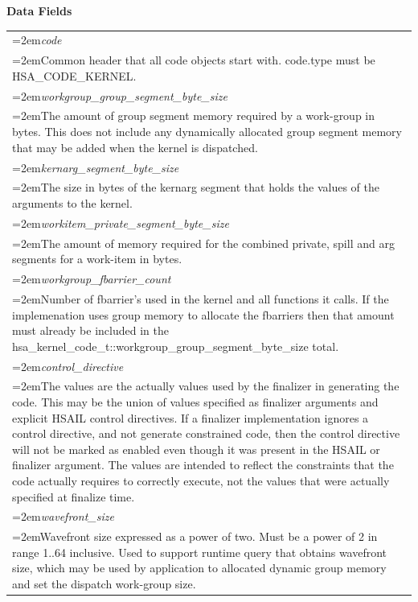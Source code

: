 \documentclass{book}
\newcommand{\hsaarg}[1]{\textit{#1}}
\newcommand{\hsatyp}[2]{\hypertarget{#1}{#2}}
\begin{document}
\begin{appendices}
\noindent\textbf{Data Fields}\\[-5mm]
\begin{longtable}{@{}>{\hangindent=2em}p{\textwidth}}
\hsaarg{code}\\\hspace{2em}Common header that all code objects start with. code.type must be HSA\_CODE\_KERNEL.\\[2mm]
\hsaarg{workgroup\_group\_segment\_byte\_size}\\\hspace{2em}The amount of group segment memory required by a work-group in bytes. This does not include any dynamically allocated group segment memory that may be added when the kernel is dispatched.\\[2mm]
\hsaarg{kernarg\_segment\_byte\_size}\\\hspace{2em}The size in bytes of the kernarg segment that holds the values of the arguments to the kernel.\\[2mm]
\hsaarg{workitem\_private\_segment\_byte\_size}\\\hspace{2em}The amount of memory required for the combined private, spill and arg segments for a work-item in bytes.\\[2mm]
\hsaarg{workgroup\_fbarrier\_count}\\\hspace{2em}Number of fbarrier's used in the kernel and all functions it calls. If the implemenation uses group memory to allocate the fbarriers then that amount must already be included in the \hsatyp{structhsa__kernel__code__s_1a0f9948c20217d0600147d5e566e47a7b}{hsa\_kernel\_code\_t::workgroup\_group\_segment\_byte\_size} total.\\[2mm]
\hsaarg{control\_directive}\\\hspace{2em}The values are the actually values used by the finalizer in generating the code. This may be the union of values specified as finalizer arguments and explicit HSAIL control directives. If a finalizer implementation ignores a control directive, and not generate constrained code, then the control directive will not be marked as enabled even though it was present in the HSAIL or finalizer argument. The values are intended to reflect the constraints that the code actually requires to correctly execute, not the values that were actually specified at finalize time.\\[2mm]
\hsaarg{wavefront\_size}\\\hspace{2em}Wavefront size expressed as a power of two. Must be a power of 2 in range 1..64 inclusive. Used to support runtime query that obtains wavefront size, which may be used by application to allocated dynamic group memory and set the dispatch work-group size.\\[2mm]

\end{longtable}
\end{appendices}
\end{document}

